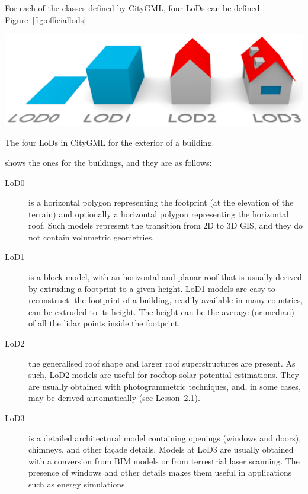 For each of the classes defined by CityGML, four LoDs can be defined.
Figure~\ref{fig:officiallods}
\begin{marginfigure}
  \centering
  \includegraphics[width=\textwidth]{figs/CityGML-LODs-c3.png}
  \caption{The four LoDs in CityGML for the exterior of a building.}%
\label{fig:officiallods}
\end{marginfigure}
shows the ones for the buildings, and they are as follows:
\begin{description}
  \item[LoD0] is a horizontal polygon representing the footprint (at the elevation of the terrain) and optionally a horizontal polygon representing the horizontal roof.
  Such models represent the transition from 2D to 3D GIS, and they do not contain volumetric geometries.
  \item[LoD1] is a block model, with an horizontal and planar roof that is usually derived by extruding a footprint to a given height.
  LoD1 models are easy to reconstruct: the footprint of a building, readily available in many countries, can be extruded to its height. The height can be the average (or median) of all the lidar points inside the footprint.
  \item[LoD2] the generalised roof shape and larger roof superstructures are present.
  As such, LoD2 models are useful for rooftop solar potential estimations.
  They are usually obtained with photogrammetric techniques, and, in some cases, may be derived automatically (see Lesson~2.1). 
  \item[LoD3] is a detailed architectural model containing openings (windows and doors), chimneys, and other façade details.
  Models at LoD3 are usually obtained with a conversion from BIM models or from terrestrial laser scanning.
  The presence of windows and other details makes them useful in applications such as energy simulations.
\end{description}

%

